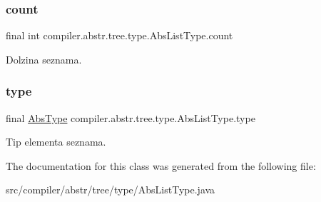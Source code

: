 \subsubsection{\texorpdfstring{count}{count}}
{\footnotesize\ttfamily final int compiler.\+abstr.\+tree.\+type.\+Abs\+List\+Type.\+count}

Dolzina seznama. \mbox{\label{classcompiler_1_1abstr_1_1tree_1_1type_1_1_abs_list_type_a3f74cdbd0bac2acaa8f3fbb41020ece2}} 
\subsubsection{\texorpdfstring{type}{type}}
{\footnotesize\ttfamily final \hyperlink{classcompiler_1_1abstr_1_1tree_1_1type_1_1_abs_type}{Abs\+Type} compiler.\+abstr.\+tree.\+type.\+Abs\+List\+Type.\+type}

Tip elementa seznama. 

The documentation for this class was generated from the following file\+:\begin{DoxyCompactItemize}
\item 
src/compiler/abstr/tree/type/Abs\+List\+Type.\+java\end{DoxyCompactItemize}
